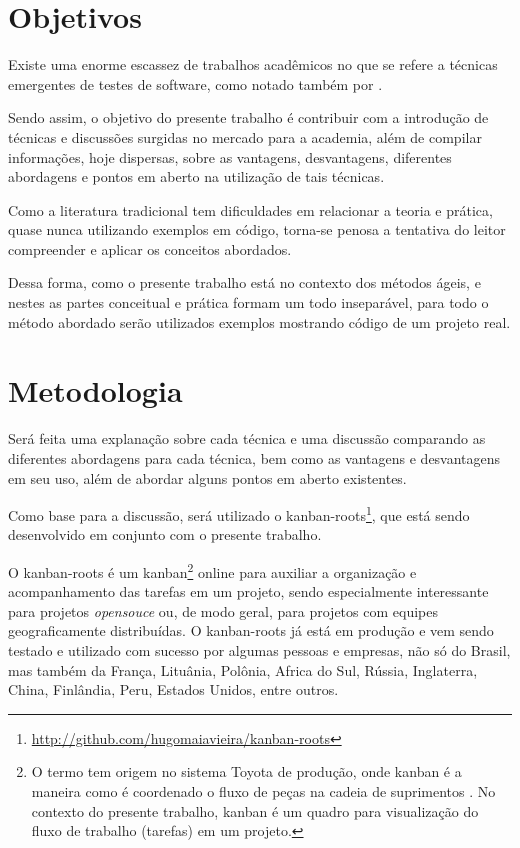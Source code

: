 \section{Objetivos}

Existe uma enorme escassez de trabalhos acadêmicos no que se refere a técnicas emergentes de testes de software, como notado também por .

Sendo assim, o objetivo do presente trabalho é contribuir com a introdução de técnicas e discussões surgidas no mercado para a academia, além de compilar informações, hoje dispersas, sobre as vantagens, desvantagens, diferentes abordagens e pontos em aberto na utilização de tais técnicas.

Como a literatura tradicional tem dificuldades em relacionar a teoria e prática, quase nunca utilizando exemplos em código, torna-se penosa a tentativa do leitor compreender e aplicar os conceitos abordados.

Dessa forma, como o presente trabalho está no contexto dos métodos ágeis, e nestes as partes conceitual e prática formam um todo inseparável, para todo o método abordado serão utilizados exemplos mostrando código de um projeto real.

\section{Metodologia}

Será feita uma explanação sobre cada técnica e uma discussão comparando as diferentes abordagens para cada técnica, bem como as vantagens e desvantagens em seu uso, além de abordar alguns pontos em aberto existentes.

Como base para a discussão, será utilizado o kanban-roots\footnote{\url{http://github.com/hugomaiavieira/kanban-roots}}, que está sendo desenvolvido em conjunto com o presente trabalho.

O kanban-roots é um kanban\footnote{O termo tem origem no sistema Toyota de produção, onde kanban é a maneira como é coordenado o fluxo de peças na cadeia de suprimentos  \cite{AMaquinaQueMudouOMundo}. No contexto do presente trabalho, kanban é um quadro para visualização do fluxo de trabalho (tarefas) em um projeto.} online para auxiliar a organização e acompanhamento das tarefas em um projeto, sendo especialmente interessante para projetos \textit{opensouce} ou, de modo geral, para projetos com equipes geograficamente distribuídas.  O kanban-roots já está em produção e vem sendo testado e utilizado com sucesso por algumas pessoas e empresas, não só do Brasil, mas também da França, Lituânia, Polônia, Africa do Sul, Rússia, Inglaterra, China, Finlândia, Peru, Estados Unidos, entre outros.

